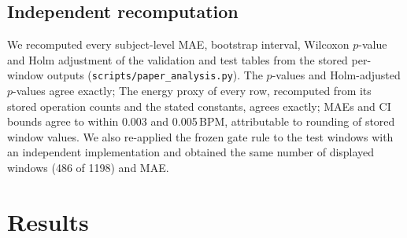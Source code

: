 \documentclass[10pt,journal]{IEEEtran}
\begin{document}
\subsection{Independent recomputation}
We recomputed every subject-level MAE, bootstrap interval, Wilcoxon $p$-value and Holm adjustment of the validation and test tables from the stored per-window outputs (\texttt{scripts/paper\_analysis.py}). The $p$-values and Holm-adjusted $p$-values agree exactly; The energy proxy of every row, recomputed from its stored operation counts and the stated constants, agrees exactly; MAEs and CI bounds agree to within 0.003 and 0.005\,BPM, attributable to rounding of stored window values. We also re-applied the frozen gate rule to the test windows with an independent implementation and obtained the same number of displayed windows (486 of 1198) and MAE.

\section{Results}\label{sec:results}
\end{document}
